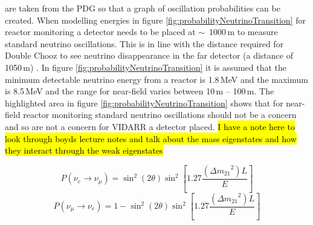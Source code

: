 are taken from the PDG \cite{Zyla_pdg_2020} so that a graph of oscillation probabilities can be created. When modelling energies in figure \ref{fig:probabilityNeutrinoTransition} for reactor monitoring a detector needs to be placed at $\sim$~1000\,m to measure standard neutrino oscillations. This is in line with the distance required for Double Chooz to see neutrino disappearance in the far detector (a distance of 1050\,m) \cite{lasserre2006} \cite{Abe_2012} \cite{abe2014improved}. In figure \ref{fig:probabilityNeutrinoTransition} it is assumed that the minimum detectable neutrino energy from a reactor is 1.8\,MeV and the maximum is 8.5\,MeV and the range for near-field varies between 10\,m -- 100\,m. The highlighted area in figure \ref{fig:probabilityNeutrinoTransition} shows that for near-field reactor monitoring standard neutrino oscillations should not be a concern and so are not a concern for VIDARR a detector placed. \hl{I have a note here to look through boyds lecture notes and talk about the mass eigenstates and how they interact through the weak eigenstates}

\begin{equation}
    P(\nu_e \rightarrow \nu_\mu) = \sin^2(2\theta)\sin^2\left[1.27\frac{({\Delta m_{21}}^2)L}{E}\right]
    \label{equ:peToPmu}
\end{equation}
\begin{equation}
    P(\nu_\mu \rightarrow \nu_e) = 1 -  \sin^2(2\theta)\sin^2\left[1.27\frac{({\Delta m_{21}}^2)L}{E}\right]
    \label{equ:pmuToPe}
\end{equation}

